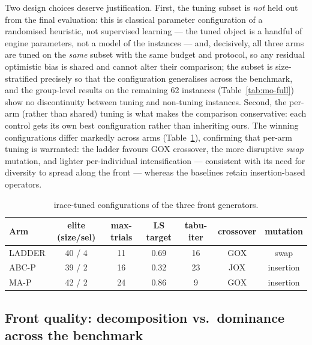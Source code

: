 \documentclass[preprint,12pt]{elsarticle}
\begin{document}
Two design choices deserve justification. First, the tuning subset is
\emph{not} held out from the final evaluation: this is classical parameter
configuration of a randomised heuristic, not supervised learning --- the
tuned object is a handful of engine parameters, not a model of the
instances --- and, decisively, all three arms are tuned on the \emph{same}
subset with the same budget and protocol, so any residual optimistic bias is
shared and cannot alter their comparison; the subset is size-stratified
precisely so that the configuration generalises across the benchmark, and
the group-level results on the remaining 62 instances
(Table~\ref{tab:mo-full}) show no discontinuity between tuning and
non-tuning instances. Second, the per-arm (rather than shared) tuning is
what makes the comparison conservative: each control gets its own best
configuration rather than inheriting ours. The
winning configurations differ markedly across arms
(Table~\ref{tab:tuned-mo}), confirming that per-arm tuning is warranted:
the ladder favours GOX crossover, the more disruptive \emph{swap}
mutation, and lighter per-individual intensification --- consistent with
its need for diversity to spread along the front --- whereas the baselines
retain insertion-based operators.

\begin{table}[htb]
\centering\small
\caption{irace-tuned configurations of the three front generators.}
\label{tab:tuned-mo}
\begin{tabular}{l cccccc}
\toprule
Arm & elite (size/sel) & max-trials & LS target & tabu-iter & crossover & mutation \\
\midrule
LADDER & 40 / 4 & 11 & 0.69 & 16 & GOX & swap \\
ABC-P  & 39 / 2 & 16 & 0.32 & 23 & JOX & insertion \\
MA-P   & 42 / 2 & 24 & 0.86 &  9 & GOX & insertion \\
\bottomrule
\end{tabular}
\end{table}

\subsection{Front quality: decomposition vs.\ dominance across the benchmark}
\label{sec:exp-pareto}
\end{document}
